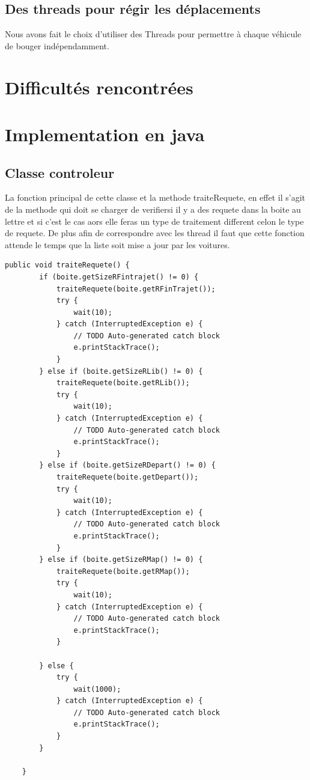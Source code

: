 \documentclass[a4paper, titlepage]{report}
\begin{document}
\section{Des threads pour régir les déplacements}

Nous avons fait le choix d'utiliser des Threads pour permettre à chaque véhicule de bouger indépendamment.

\chapter{Difficultés rencontrées}

\chapter{Implementation en java}
\section{Classe controleur}
La fonction principal de cette classe et la methode traiteRequete, en effet il s'agit de la methode qui doit se charger de verifiersi il y a des requete dans la boite au lettre et si c'est le cas aors elle feras un type de traitement different celon le type de requete. De plus afin de correspondre avec les thread il faut que cette fonction attende le temps	que la liste soit mise a jour par les voitures.\\
\begin{lstlisting}
public void traiteRequete() {
		if (boite.getSizeRFintrajet() != 0) {
			traiteRequete(boite.getRFinTrajet());
			try {
				wait(10);
			} catch (InterruptedException e) {
				// TODO Auto-generated catch block
				e.printStackTrace();
			}
		} else if (boite.getSizeRLib() != 0) {
			traiteRequete(boite.getRLib());
			try {
				wait(10);
			} catch (InterruptedException e) {
				// TODO Auto-generated catch block
				e.printStackTrace();
			}
		} else if (boite.getSizeRDepart() != 0) {
			traiteRequete(boite.getDepart());
			try {
				wait(10);
			} catch (InterruptedException e) {
				// TODO Auto-generated catch block
				e.printStackTrace();
			}
		} else if (boite.getSizeRMap() != 0) {
			traiteRequete(boite.getRMap());
			try {
				wait(10);
			} catch (InterruptedException e) {
				// TODO Auto-generated catch block
				e.printStackTrace();
			}

		} else {
			try {
				wait(1000);
			} catch (InterruptedException e) {
				// TODO Auto-generated catch block
				e.printStackTrace();
			}
		}

	}
\end{lstlisting}
\end{document}
